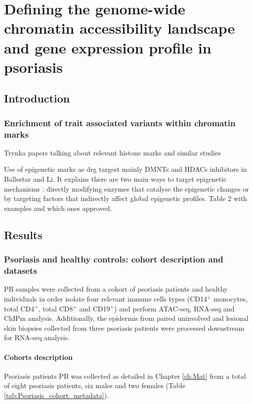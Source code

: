 \chapter{Defining the genome-wide chromatin accessibility landscape and gene expression profile in psoriasis}
\label{ch:Results 2}


\section{Introduction}

\subsection{Enrichment of trait associated variants within chromatin marks }
Trynka papers talking about relevant histone marks and similar studies


Use of epigenetic marks as drg targest mainly DMNTs and HDACs inhibitors in Ballestar and Li. It explains there are two main ways to target epigenetic mechanisms : directly modifying enzymes that catalyse the epigenetic changes  or by targeting factors that indirectly affect global epigenetic profiles. Table 2 with examples and which ones approved.

\section{Results}
\subsection{Psoriasis and healthy controls: cohort description and datasets}
PB samples were collected from a cohort of psoriasis patients and healthy individuals in order isolate four relevant immune cells types (CD14$^+$ monocytes, total CD4$^+$, total CD8$^+$ and CD19$^+$) and perform ATAC-seq, RNA-seq and ChIPm analysis. Additionally, the epidermis from paired uninvolved and lesional skin biopsies collected from three psoriasis patients were processed downstream for RNA-seq analysis.

\subsubsection{Cohorts description}

Psoriasis patients PB was collected as detailed in Chapter \ref{ch:Mat} from a total of eight psoriasis patients, six males and two females (Table \ref{tab:Psoriasis_cohort_metadata}). 

